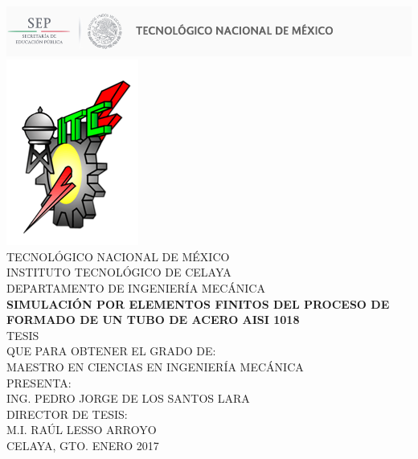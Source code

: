 \begin{titlepage}
\begin{center}
\includegraphics[scale=0.4]{src/logo_tecnm.png}
\hfill 
\includegraphics[scale=0.45]{src/logo_tec.PNG}\\[5 mm]
{\large TECNOLÓGICO NACIONAL DE MÉXICO} \\[2 mm]
{\large INSTITUTO TECNOLÓGICO DE CELAYA} \\[2 mm]
{\large DEPARTAMENTO DE INGENIERÍA MECÁNICA} \\[18 mm]

{\Large\bfseries SIMULACIÓN POR ELEMENTOS FINITOS DEL PROCESO DE FORMADO DE UN TUBO DE ACERO AISI 1018} \\[18 mm]

{\large TESIS} \\[18 mm]

{\large QUE PARA OBTENER EL GRADO DE:} \\[2 mm]
{\large MAESTRO EN CIENCIAS EN INGENIERÍA MECÁNICA} \\[18 mm]

{\large PRESENTA: }\\[2 mm]
{\large ING. PEDRO JORGE DE LOS SANTOS LARA} \\[18 mm]

{\large DIRECTOR DE TESIS:} \\[2 mm]
{\large M.I. RAÚL LESSO ARROYO} \\[18 mm]

{\large CELAYA, GTO. \hfill ENERO 2017}
\end{center}
\end{titlepage}